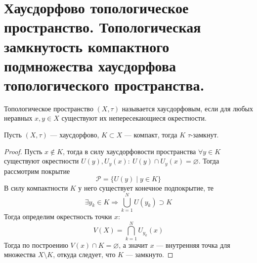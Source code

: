 \newpage
\section{Хаусдорфово топологическое пространство. Топологическая замкнутость компактного подмножества хаусдорфова топологического пространства.}
\begin{definition}
Топологическое пространство $(X, \tau)$ называется хаусдорфовым, если для любых неравных $x,y \in X$ существуют их непересекающиеся окрестности.
\end{definition}
\begin{claim}
Пусть $(X,\tau)$ --- хаусдорфово, $K \subset X$ --- компакт, тогда $K$ $\tau$-замкнут. 
\end{claim}
\begin{proof}
Пусть $x \notin K$, тогда в силу хаусдорфовости пространства $\forall y \in K$ существуют окрестности $U(y), U_y(x): \ U(y) \cap U_y(x) = \varnothing$. Тогда рассмотрим покрытие 
$$
\mathcal{P} = \{U(y) \mid y \in K\}
$$
В силу компактности $K$ у него существует конечное подпокрытие, те 
$$
\exists y_k \in K \Rightarrow \bigcup_{k=1}^N U(y_k) \supset K
$$
Тогда определим окрестность точки $x$:
$$
V(X) = \bigcap_{k=1}^N U_{y_k}(x)
$$
Тогда по построению $V(x) \cap K = \varnothing$, а значит $x$ --- внутренняя точка для множества $X \setminus K$, откуда следует, что $K$ --- замкнуто. 
\end{proof}
